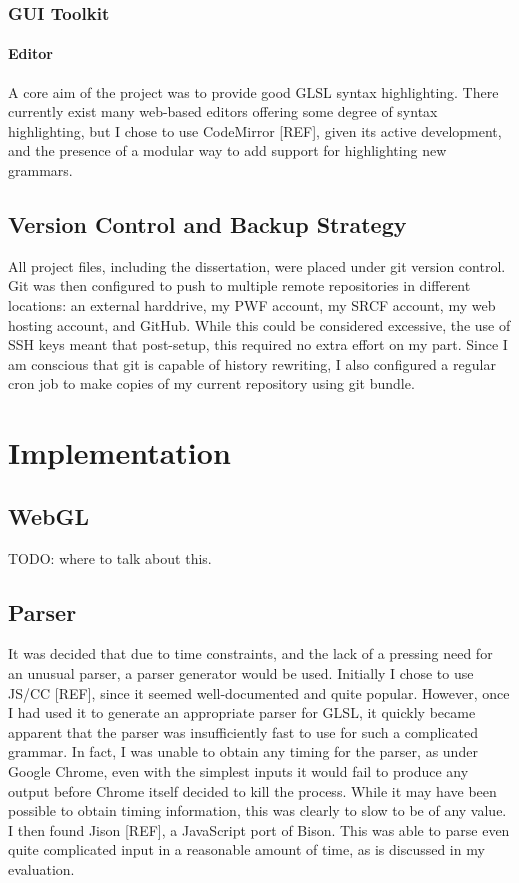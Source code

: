 \documentclass[12pt,twoside,notitlepage]{report}
\begin{document}
\subsection{GUI Toolkit}
\subsubsection{Editor}
A core aim of the project was to provide good GLSL syntax highlighting. There currently exist many web-based editors offering some degree of syntax highlighting, but I chose to use CodeMirror [REF], given its active development, and the presence of a modular way to add support for highlighting new grammars. 

\section{Version Control and Backup Strategy}
All project files, including the dissertation, were placed under git version control. Git was then configured to push to multiple remote repositories in different locations: an external harddrive, my PWF account, my SRCF account, my web hosting account, and GitHub. While this could be considered excessive, the use of SSH keys meant that post-setup, this required no extra effort on my part. Since I am conscious that git is capable of history rewriting, I also configured a regular cron job to make copies of my current repository using git bundle.

\cleardoublepage
\chapter{Implementation}

\section{WebGL}
TODO: where to talk about this.

\section{Parser}
It was decided that due to time constraints, and the lack of a pressing need for an unusual parser, a parser generator would be used. Initially I chose to use JS/CC [REF], since it seemed well-documented and quite popular. However, once I had used it to generate an appropriate parser for GLSL, it quickly became apparent that the parser was insufficiently fast to use for such a complicated grammar. In fact, I was unable to obtain any timing for the parser, as under Google Chrome, even with the simplest inputs it would fail to produce any output before Chrome itself decided to kill the process. While it may have been possible to obtain timing information, this was clearly to slow to be of any value. I then found Jison [REF], a JavaScript port of Bison. This was able to parse even quite complicated input in a reasonable amount of time, as is discussed in my evaluation.
\end{document}
